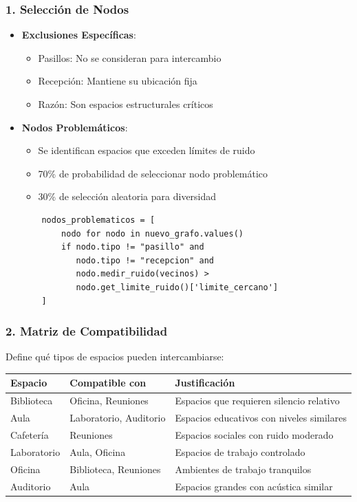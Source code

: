 \documentclass[a4paper,12pt]{article}
\begin{document}
\subsubsection{1. Selección de Nodos}
\begin{itemize}
    \item \textbf{Exclusiones Específicas}:
    \begin{itemize}
        \item Pasillos: No se consideran para intercambio
        \item Recepción: Mantiene su ubicación fija
        \item Razón: Son espacios estructurales críticos
    \end{itemize}
    
    \item \textbf{Nodos Problemáticos}:
    \begin{itemize}
        \item Se identifican espacios que exceden límites de ruido
        \item 70\% de probabilidad de seleccionar nodo problemático
        \item 30\% de selección aleatoria para diversidad
    \end{itemize}
    
    \lstset{language=Python}
    \begin{lstlisting}
    nodos_problematicos = [
        nodo for nodo in nuevo_grafo.values()
        if nodo.tipo != "pasillo" and 
           nodo.tipo != "recepcion" and
           nodo.medir_ruido(vecinos) > 
           nodo.get_limite_ruido()['limite_cercano']
    ]
    \end{lstlisting}
\end{itemize}

\subsubsection{2. Matriz de Compatibilidad}
Define qué tipos de espacios pueden intercambiarse:

\begin{center}
    \begin{tabular}{|l|l|p{7cm}|}
        \hline
        \textbf{Espacio} & \textbf{Compatible con} & \textbf{Justificación} \\
        \hline
        Biblioteca & Oficina, Reuniones & Espacios que requieren silencio relativo \\
        \hline
        Aula & Laboratorio, Auditorio & Espacios educativos con niveles similares \\
        \hline
        Cafetería & Reuniones & Espacios sociales con ruido moderado \\
        \hline
        Laboratorio & Aula, Oficina & Espacios de trabajo controlado \\
        \hline
        Oficina & Biblioteca, Reuniones & Ambientes de trabajo tranquilos \\
        \hline
        Auditorio & Aula & Espacios grandes con acústica similar \\
        \hline
    \end{tabular}
\end{center}
\end{document}
